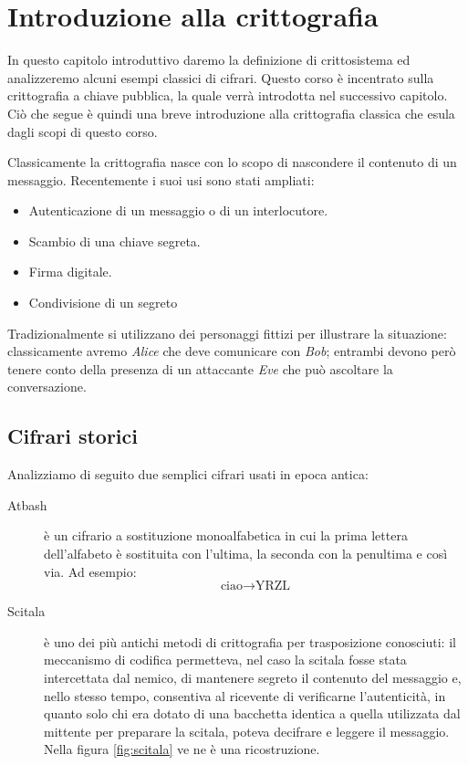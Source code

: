 %
%
\chapter{Introduzione alla crittografia}

	In questo capitolo introduttivo daremo la definizione di crittosistema ed analizzeremo alcuni esempi classici di cifrari.
	Questo corso è incentrato sulla crittografia a chiave pubblica, la quale verrà introdotta nel successivo capitolo.
	Ciò che segue è quindi una breve introduzione alla crittografia classica che esula dagli scopi di questo corso.

	Classicamente la crittografia nasce con lo scopo di nascondere il contenuto di un messaggio.
	Recentemente i suoi usi sono stati ampliati:
	\begin{itemize}
		\item Autenticazione di un messaggio o di un interlocutore.
		\item Scambio di una chiave segreta.
		\item Firma digitale.
		\item Condivisione di un segreto
	\end{itemize}

	Tradizionalmente si utilizzano dei personaggi fittizi per illustrare la situazione: classicamente avremo \emph{Alice} che deve comunicare con \emph{Bob}; entrambi devono però tenere conto della presenza di un attaccante \emph{Eve} che può ascoltare la conversazione.

\section{Cifrari storici}

	Analizziamo di seguito due semplici cifrari usati in epoca antica:
	\begin{description}
		\item[Atbash] è un cifrario a sostituzione monoalfabetica in cui la prima lettera dell'alfabeto è sostituita con l'ultima, la seconda con la penultima e così via. Ad esempio:
			\[
			\text{ciao} \longrightarrow \text{YRZL}
			\]
		\item[Scitala] è uno dei più antichi metodi di crittografia per trasposizione conosciuti: il meccanismo di codifica permetteva, nel caso la scitala fosse stata intercettata dal nemico, di mantenere segreto il contenuto del messaggio e, nello stesso tempo, consentiva al ricevente di verificarne l'autenticità, in quanto solo chi era dotato di una bacchetta identica a quella utilizzata dal mittente per preparare la scitala, poteva decifrare e leggere il messaggio. Nella figura \autoref{fig:scitala} ve ne è una ricostruzione.
	\end{description}

